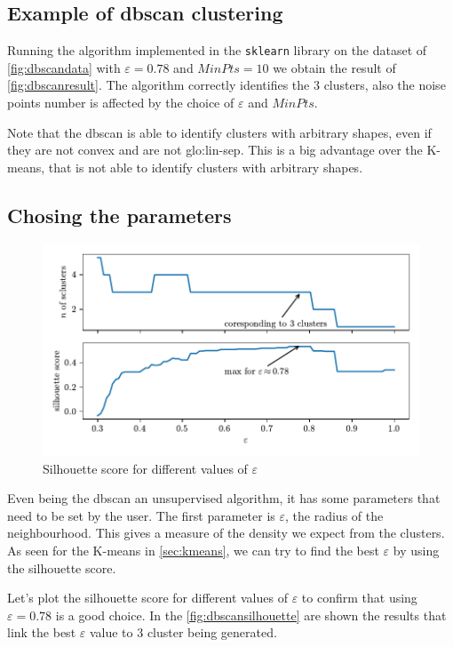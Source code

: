 \subsection{Example of \gls{dbscan} clustering}
Running the algorithm implemented in the \texttt{sklearn} library on the dataset of \autoref{fig:dbscandata} with $\varepsilon = 0.78$ and $MinPts = 10$ we obtain the result of \autoref{fig:dbscanresult}. The algorithm correctly identifies the $3$ clusters, also the noise points number is affected by the choice of $\varepsilon$ and $MinPts$.

Note that the \gls{dbscan} is able to identify clusters with arbitrary shapes, even if they are not convex and are not \gls{glo:lin-sep}. This is a big advantage over the K-means, that is not able to identify clusters with arbitrary shapes.

\subsection{Chosing the parameters}

\begin{figure}
    \centering
    \includegraphics{images/DBSCAN/Figure_4.pdf}
    \caption{Silhouette score for different values of $\varepsilon$}
    \label{fig:dbscansilhouette}
\end{figure}

Even being the \gls{dbscan} an unsupervised algorithm, it has some parameters that need to be set by the user.
The first parameter is $\varepsilon$, the radius of the neighbourhood. This gives a measure of the density we expect from the clusters. As seen for the K-means in \autoref{sec:kmeans}, we can try to find the best $\varepsilon$ by using the silhouette score.

Let's plot the silhouette score for different values of $\varepsilon$ to confirm that using $\varepsilon = 0.78$ is a good choice. In the \autoref{fig:dbscansilhouette} are shown the results that link the best $\varepsilon$ value to $3$ cluster being generated.

